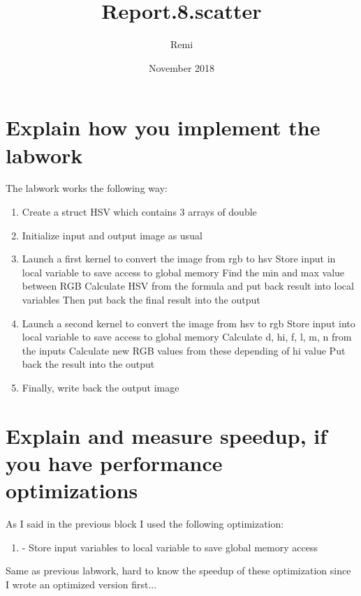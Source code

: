 \documentclass{article}
\title{Report.8.scatter}
\author{Remi}
\date{November 2018}
\begin{document}
\maketitle

\section{Explain how you implement the labwork}

The labwork works the following way:
\begin{enumerate}  
\item Create a struct HSV which contains 3 arrays of double
\item Initialize input and output image as usual
\item Launch a first kernel to convert the image from rgb to hsv
    \subitem Store input in local variable to save access to global memory
    \subitem Find the min and max value between RGB
    \subitem Calculate HSV from the formula and put back result into local variables
    \subitem Then put back the final result into the output
\item Launch a second kernel to convert the image from hsv to rgb
    \subitem Store input into local variable to save access to global memory
    \subitem Calculate d, hi, f, l, m, n from the inputs
    \subitem Calculate new RGB values from these depending of hi value
    \subitem Put back the result into the output
\item Finally, write back the output image
\end{enumerate}

\section{Explain and measure speedup, if you have performance optimizations}
As I said in the previous block I used the following optimization:
\begin{enumerate}  
\item - Store input variables to local variable to save global memory access
\end{enumerate}

Same as previous labwork, hard to know the speedup of these optimization since I wrote an optimized version first...
\end{document}
